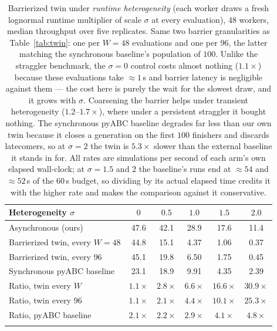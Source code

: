 \begin{table}[t]
\caption{Barrierized twin under \emph{runtime heterogeneity} (each worker draws a fresh lognormal runtime multiplier of scale $\sigma$ at every evaluation), $48$ workers, median throughput over five replicates. Same two barrier granularities as Table~\ref{tab:twin}: one per $W{=}48$ evaluations and one per $96$, the latter matching the synchronous baseline's population of $100$. Unlike the straggler benchmark, the $\sigma{=}0$ control costs almost nothing ($1.1\times$) because these evaluations take ${\approx}1$\,s and barrier latency is negligible against them --- the cost here is purely the wait for the slowest draw, and it grows with $\sigma$. Coarsening the barrier helps under transient heterogeneity ($1.2$--$1.7\times$), where under a persistent straggler it bought nothing. The synchronous pyABC baseline degrades far less than our own twin because it closes a generation on the first $100$ finishers and discards latecomers, so at $\sigma{=}2$ the twin is $5.3\times$ slower than the external baseline it stands in for. All rates are simulations per second of each arm's own elapsed wall-clock; at $\sigma{=}1.5$ and $2$ the baseline's runs end at ${\approx}54$ and ${\approx}52$\,s of the $60$\,s budget, so dividing by its actual elapsed time credits it with the higher rate and makes the comparison against it conservative.}\label{tab:twin-hetero}
\centering
\begin{tabular}{@{}lccccc@{}}
\toprule
Heterogeneity $\sigma$ & $0$ & $0.5$ & $1.0$ & $1.5$ & $2.0$ \\
\midrule
Asynchronous (ours)               & 47.6 & 42.1 & 28.9 & 17.6 & 11.4 \\
Barrierized twin, every $W{=}48$  & 44.8 & 15.1 & 4.37 & 1.06 & 0.37 \\
Barrierized twin, every $96$      & 45.1 & 19.8 & 6.50 & 1.75 & 0.45 \\
Synchronous pyABC baseline        & 23.1 & 18.9 & 9.91 & 4.35 & 2.39 \\
\midrule
Ratio, twin every $W$   & $1.1\times$ & $2.8\times$ & $6.6\times$ & $16.6\times$ & $30.9\times$ \\
Ratio, twin every $96$  & $1.1\times$ & $2.1\times$ & $4.4\times$ & $10.1\times$ & $25.3\times$ \\
Ratio, pyABC baseline   & $2.1\times$ & $2.2\times$ & $2.9\times$ & $4.1\times$ & $4.8\times$ \\
\botrule
\end{tabular}
\end{table}

